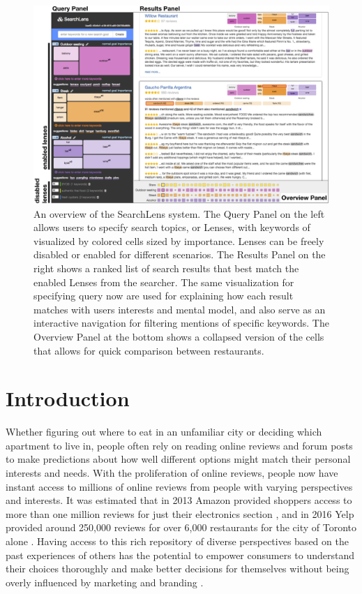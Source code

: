 \documentclass{sigchi}
\begin{document}
\begin{figure}[ht]
    \centering
    \includegraphics[width=1\textwidth]{figures/main_annotated.png}
    \caption{An overview of the SearchLens system. The Query Panel on the left allows users to specify search topics, or Lenses, with keywords of visualized by colored cells sized by importance. Lenses can be freely disabled or enabled for different scenarios. The Results Panel on the right shows a ranked list of search results that best match the enabled Lenses from the searcher. The same visualization for specifying query now are used for explaining how each result matches with users interests and mental model, and also serve as an interactive navigation for filtering mentions of specific keywords. The Overview Panel at the bottom shows a collapsed version of the cells that allows for quick comparison between restaurants.}
    \label{fig:flow}
\end{figure}

\section{Introduction}

Whether figuring out where to eat in an unfamiliar city or deciding which apartment to live in, people often rely on reading online reviews and forum posts to make predictions about how well different options might match their personal interests and needs.  With the proliferation of online reviews, people now have instant access to millions of online reviews from people with varying perspectives and interests. It was estimated that in 2013 Amazon provided shoppers access to more than one million reviews for just their electronics section \cite{mcauley2013hidden}, and in 2016 Yelp provided around 250,000 reviews for over 6,000 restaurants for the city of Toronto alone \cite{yelpdata}. Having access to this rich repository of diverse perspectives based on the past experiences of others has the potential to empower consumers to understand their choices thoroughly and make better decisions for themselves without being overly influenced by marketing and branding \cite{de2015navigating}.
\end{document}
